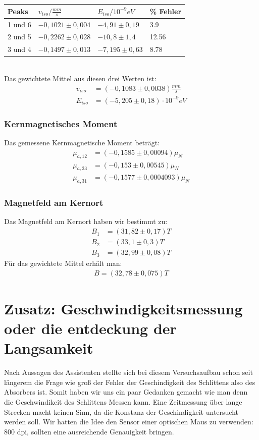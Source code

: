 \documentclass[12pt]{article}
\begin{document}
\begin{tabular}{|l|lll|}
\hline
Peaks & $v_{iso}/\frac{mm}{s}$ & $E_{iso}/10^{-9}eV$ & \% Fehler\\
\hline
1 und 6& $-0,1021 \pm 0,004$ & $-4,91 \pm 0,19$ & 3.9\\
2 und 5& $-0,2262 \pm 0,028$ & $-10,8 \pm 1,4$ & 12.56\\
3 und 4& $-0,1497 \pm 0,013$ & $-7,195 \pm 0,63$ & 8.78\\
\hline
\end{tabular} \\

Das gewichtete Mittel aus diesen drei Werten ist:
\begin{align*}
  v_{iso} &= ( -0,1083 \pm 0,0038) \frac{mm}{s} \\
 E_{iso} &= ( -5,205 \pm 0,18 ) \cdot 10^{-9} eV
\end{align*}

\subsubsection*{Kernmagnetisches Moment}
Das gemessene Kernmagnetische Moment beträgt:
\begin{align}
\mu_{a,12} &=  (-0,1585 \pm 0,00094) \mu_N \\
\mu_{a,23} &=  (-0,153 \pm 0,00545) \mu_N \\
\mu_{a,31} &=  (-0,1577 \pm 0,0004093) \mu_N 
\end{align}

\subsubsection*{Magnetfeld am Kernort}
Das Magnetfeld am Kernort haben wir bestimmt zu:
\begin{align*}
  B_1 &= (31,82\pm0,17)T \\
 B_2 &= (33,1\pm0,3)T \\
 B_3 &= (32,99\pm0,08)T
\end{align*}
Für das gewichtete Mittel erhält man:
\begin{align*}
 B = (32,78 \pm 0,075)T
\end{align*}


\section{Zusatz: Geschwindigkeitsmessung oder die entdeckung der Langsamkeit}
Nach Aussagen des Assistenten stellte sich bei diesem Versuchsaufbau schon seit längerem die Frage wie groß der Fehler der Geschindigkeit des Schlittens also des Absorbers ist. Somit haben wir uns ein paar Gedanken gemacht wie man denn die Geschwindikeit des Schlittens Messen kann. Eine Zeitmessung über lange Strecken macht keinen Sinn, da die Konstanz der Geschindigkeit untersucht werden soll. Wir hatten die Idee den Sensor einer optischen Maus zu verwenden: 800 dpi, sollten eine ausreichende Genauigkeit bringen.
\end{document}
